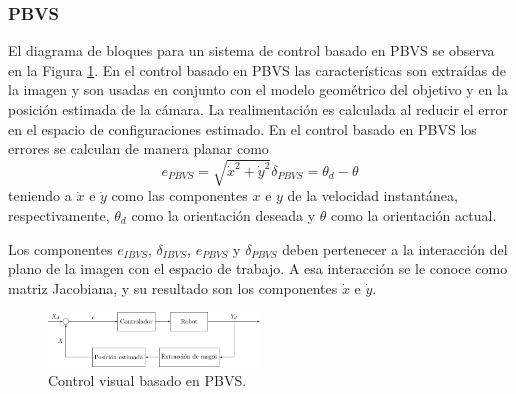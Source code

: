 \subsubsection{PBVS}
El diagrama de bloques para un sistema de control basado en PBVS se observa en la Figura \ref{fig:PBVS}. En el control basado en PBVS las características son extraídas de la imagen y son usadas en conjunto con el modelo geométrico del objetivo y en la posición estimada de la cámara. La realimentación es calculada al reducir el error en el espacio de configuraciones estimado.
En el control basado en PBVS los errores se calculan de manera planar como
\begin{subequations}
	\begin{equation}\label{eq:epbvs}
		e_{PBVS}=\sqrt{\dot{x}^{2}+\dot{y}^2}
	\end{equation}
	\begin{equation}\label{eq:dpbvs}
		\delta_{PBVS}=\theta_{d}-\theta
	\end{equation}
\end{subequations}
teniendo a $\dot{x}$ e $\dot{y}$ como las componentes $x$ e $y$ de la velocidad instantánea, respectivamente, $\theta_{d}$ como la orientación deseada y $\theta$ como la orientación actual.
\par Los componentes $e_{IBVS}$, $\delta_{IBVS}$, $e_{PBVS}$ y $\delta_{PBVS}$ deben pertenecer a la interacción del plano de la imagen con el espacio de trabajo. A esa interacción se le conoce como matriz Jacobiana, y su resultado son los componentes $\dot{x}$ e $\dot{y}$.
\begin{figure}[htbp!]
	\centering
	\includegraphics[width=0.5\textwidth]{./Figuras/PBVS/PBVS}
	\caption{Control visual basado en PBVS.}
	\label{fig:PBVS}
\end{figure}